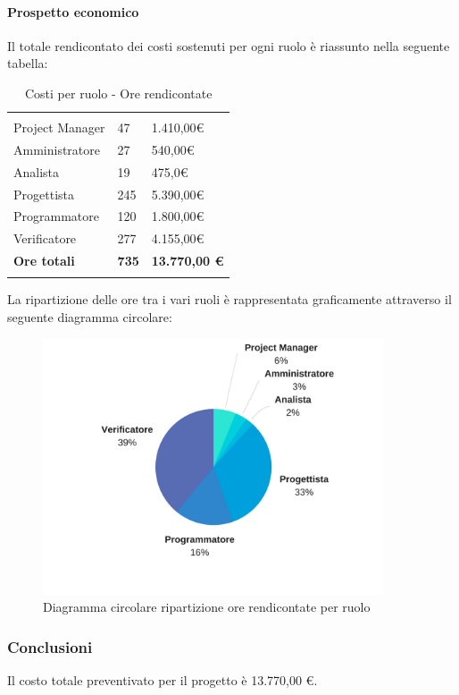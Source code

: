 			
			\paragraph{Prospetto economico} \Spazio
			Il totale rendicontato dei costi sostenuti per ogni ruolo è riassunto nella seguente tabella:
			\begin{table}[H]
				\centering
				\begin{tabular}{|p{4cm}|C{4cm}|C{4cm}|}
					
					 & &\\
					Project Manager & 47 & 1.410,00\euro \\
					\hline
					Amministratore& 27 & 540,00\euro \\
					\hline
					Analista & 19 & 475,0\euro \\
					\hline
					Progettista & 245 & 5.390,00\euro \\
					\hline
					Programmatore & 120 & 1.800,00\euro \\
					\hline
					Verificatore & 277 & 4.155,00\euro \\
					\hline
					\textbf{Ore totali} & \textbf{735} & \textbf{13.770,00 \euro} \\
				\end{tabular}
				\caption{Costi per ruolo - Ore rendicontate}
			\end{table}
		
			La ripartizione delle ore tra i vari ruoli è rappresentata graficamente attraverso il seguente diagramma circolare:
		
			\begin{figure}[H] 
				\centering 
				\includegraphics[width=0.9\textwidth]{images/CircolareSoloRendicontate.png} 
				\caption{Diagramma circolare ripartizione ore rendicontate per ruolo}
				\label{CircolareSoloRendicontate}
			\end{figure}
			
		
			
			\subsubsection{Conclusioni}
			
			Il costo totale preventivato per il progetto è 13.770,00 \euro.
